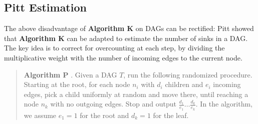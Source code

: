 \documentclass[acmsmall]{acmart}
\begin{document}
\begin{tcolorbox}[
    colback=SkyBlue!5,
    colframe=blue!20,
    boxrule=1pt,
    arc=2pt,
    width=\textwidth,
    boxsep=5pt,
    left=5pt,
    right=5pt,
    top=5pt,
    bottom=5pt
]
\begin{minipage}[b]{0.40\textwidth}











\end{minipage}%
\end{tcolorbox}



\subsection{Pitt Estimation}

The above disadvantage of \textbf{Algorithm K} on DAGs can be rectified:
Pitt \cite{pitt} showed that \textbf{Algorithm K} can be adapted to estimate the number of sinks in a DAG. 
The key idea is to correct for overcounting at each step,  by dividing  the multiplicative weight with the  number of incoming edges to the current node.

\begin{verse}
\textbf{Algorithm P} \cite{pitt}.
Given a DAG $T$, run the following randomized procedure.
Starting at the root, for each node $n_i$ with $d_i$ children and $e_i$ incoming edges,
pick a child uniformly at random and move there, until reaching a node $n_k$ with no outgoing edges.
Stop and output $\frac{d_1}{e_1} \ldots \frac{d_k}{e_k}$.
In the algorithm, we assume $e_1 = 1$ for the root and $d_k = 1$ for the leaf.
\end{verse}
\end{document}
